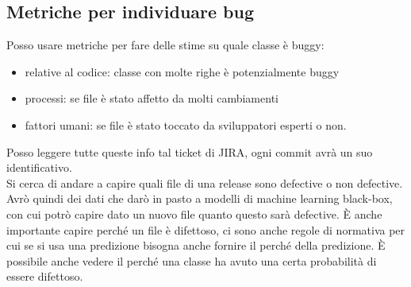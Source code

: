 \documentclass{article}
\begin{document}
\subsection{Metriche per individuare bug}
Posso usare metriche per fare delle stime su quale classe è buggy:
\begin{itemize}
\item relative al codice: classe con molte righe è potenzialmente buggy
\item processi: se file è stato affetto da molti cambiamenti
\item fattori umani: se file è stato toccato da sviluppatori esperti o non.
\end{itemize}
Posso leggere tutte queste info tal ticket di JIRA, ogni commit avrà un suo identificativo.\\ Si cerca di andare a capire quali file di una release sono defective o non defective. Avrò quindi dei dati che darò in pasto a modelli di machine learning black-box, con cui potrò capire dato un nuovo file quanto questo sarà defective.
È anche importante capire perché un file è difettoso, ci sono anche regole di normativa per cui se si usa una predizione bisogna anche fornire il perché della predizione. È possibile anche vedere il perché una classe ha avuto una certa probabilità di essere difettoso.
\end{document}

